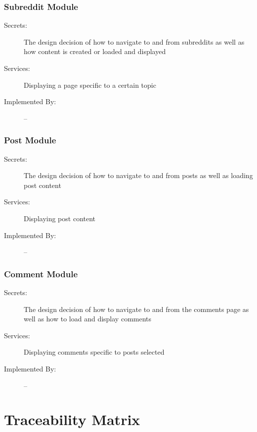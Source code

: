 \documentclass[12pt,fleqn]{article}
\begin{document}
\subsubsection{Subreddit Module}
\begin{description}
\item[Secrets:] The design decision of how to navigate to and from subreddits as well as how content is created or loaded and displayed
\item[Services:] Displaying a page specific to a certain topic
\item[Implemented By:] --
\end{description}

\subsubsection{Post Module}
\begin{description}
\item[Secrets:] The design decision of how to navigate to and from posts as well as loading post content
\item[Services:] Displaying post content
\item[Implemented By:] --
\end{description}

\subsubsection{Comment Module}
\begin{description}
\item[Secrets:] The design decision of how to navigate to and from the comments page as well as how to load and display comments
\item[Services:] Displaying comments specific to posts selected
\item[Implemented By:] --
\end{description}

\section{Traceability Matrix} \label{sec:tracematrix}
\end{document}
